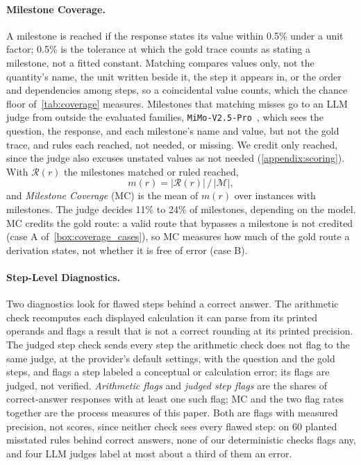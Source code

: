 \paragraph{Milestone Coverage.} A milestone is reached if the response states its value within
0.5\% under a unit factor; 0.5\% is the tolerance at which the gold trace counts as stating a
milestone, not a fitted constant.
Matching compares values only, not the quantity's name, the unit written beside it, the step it
appears in, or the order and dependencies among steps, so a coincidental value counts, which the
chance floor of~\autoref{tab:coverage} measures.
Milestones that matching misses go to an LLM judge from outside the evaluated families,
\texttt{MiMo-V2.5-Pro}~\citep{mimov25pro}, which sees the question, the response, and each
milestone's name and value, but not the gold trace, and rules each reached, not needed, or missing.
We credit only reached, since the judge also excuses unstated values as not needed
(\autoref{appendix:scoring}).
With $\mathcal{R}(r)$ the milestones matched or ruled reached,
\begin{equation}
    m(r) = |\mathcal{R}(r)| \,/\, |\mathcal{M}|,
    \label{eq:coverage}
\end{equation}
and \emph{Milestone Coverage} (MC) is the mean of $m(r)$ over instances with milestones.
The judge decides 11\% to 24\% of milestones, depending on the model.
MC credits the gold route: a valid route that bypasses a milestone is not credited (case A
of~\autoref{box:coverage_cases}), so MC measures how much of the gold route a derivation states,
not whether it is free of error (case B).

\paragraph{Step-Level Diagnostics.} Two diagnostics look for flawed steps behind a correct answer.
The arithmetic check recomputes each displayed calculation it can parse from its printed operands
and flags a result that is not a correct rounding at its printed precision.
The judged step check sends every step the arithmetic check does not flag to the same judge, at the
provider's default settings, with the question and the gold steps, and flags a step labeled a
conceptual or calculation error; its flags are judged, not verified.
\emph{Arithmetic flags} and \emph{judged step flags} are the shares of correct-answer responses with
at least one such flag; MC and the two flag rates together are the process measures of this paper.
Both are flags with measured precision, not scores, since neither check sees every flawed step: on
60 planted misstated rules behind correct answers, none of our deterministic checks flags any, and
four LLM judges label at most about a third of them an error.

